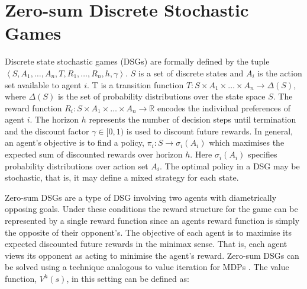 \section{Zero-sum Discrete Stochastic Games}
\label{sec:dsg}
Discrete state stochastic games (DSGs) are formally defined by the tuple
$ \left\langle S, A_{1}, \ldots, A_{n}, T, R_{1}, \ldots, R_{n}, h, \gamma\right\rangle$.
$S$ is a set of discrete states and $A_i$ is the action set available to agent 
$i$. T is a transition function $T : S \times A_1 \times \ldots \times A_n \rightarrow \Delta(S)$, 
where $\Delta(S)$ is the set of probability distributions over the state space $S$. 
The reward function $R_i : S \times A_1 \times \ldots \times A_n \rightarrow \mathbb{R}$ 
encodes the individual preferences of agent $i$. The horizon $h$ represents the 
number of decision steps until termination and the discount factor $\gamma \in [0, 1)$ 
is used to discount future rewards. In general, an agent's objective is 
to find a policy, $\pi_i : S \rightarrow \sigma_i(A_i)$ which maximises the expected 
sum of discounted rewards over horizon $h$. Here $\sigma_i(A_i)$ specifies
probability distributions over action set $A_i$. The optimal policy in a 
DSG may be stochastic, that is, it may define a mixed strategy for each state. 



Zero-sum DSGs are a type of DSG involving two agents with diametrically
opposing goals. Under these conditions the reward structure for the 
game can be represented by a single reward function since an agents
reward function is simply the opposite of their opponent's. The objective
of each agent is to maximise its expected discounted future rewards 
in the minimax sense. That is, each agent views its opponent as
acting to minimise the agent's reward. Zero-sum DSGs can be solved 
using a technique analogous to value iteration for MDPs \cite{Littman_ICML_1994}. 
The value function, $V^{h}(s)$, in this setting can be defined as:

